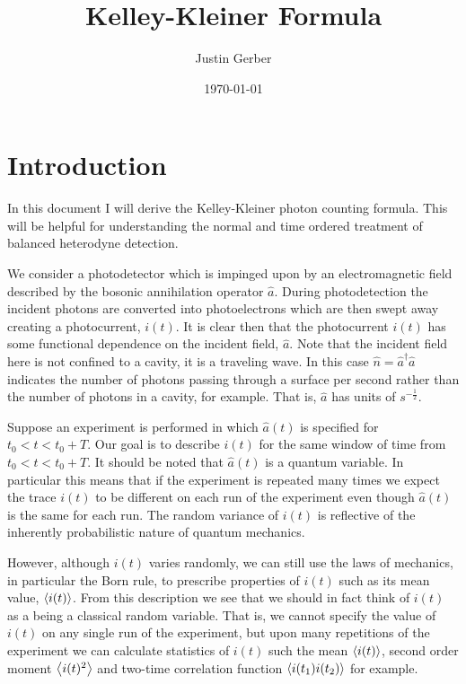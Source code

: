 \documentclass[12pt]{article}
\begin{document}
\title{Kelley-Kleiner Formula}
\author{Justin Gerber}
\date{\today}
\maketitle

\section{Introduction}
In this document I will derive the Kelley-Kleiner photon counting formula. This will be helpful for understanding the normal and time ordered treatment of balanced heterodyne detection.

We consider a photodetector which is impinged upon by an electromagnetic field described by the bosonic annihilation operator $\hat{a}$. During photodetection the incident photons are converted into photoelectrons which are then swept away creating a photocurrent, $i(t)$. It is clear then that the photocurrent $i(t)$ has some functional dependence on the incident field, $\hat{a}$. Note that the incident field here is not confined to a cavity, it is a traveling wave. In this case $\hat{n} = \hat{a}^{\dag} \hat{a}$ indicates the number of photons passing through a surface per second rather than the number of photons in a cavity, for example. That is, $\hat{a}$ has units of $s^{-\frac{1}{2}}$.

Suppose an experiment is performed in which $\hat{a}(t)$ is specified for $t_0<t<t_0+T$. Our goal is to describe $i(t)$ for the same window of time from $t_0<t<t_0+T$. It should be noted that $\hat{a}(t)$ is a quantum variable. In particular this means that if the experiment is repeated many times we expect the trace $i(t)$ to be different on each run of the experiment even though $\hat{a}(t)$ is the same for each run. The random variance of $i(t)$ is reflective of the inherently probabilistic nature of quantum mechanics.

However, although $i(t)$ varies randomly, we can still use the laws of mechanics, in particular the Born rule, to prescribe properties of $i(t)$ such as its mean value, $\Braket{i(t)}$. From this description we see that we should in fact think of $i(t)$ as a being a classical random variable. That is, we cannot specify the value of $i(t)$ on any single run of the experiment, but upon many repetitions of the experiment we can calculate statistics of $i(t)$ such the mean $\Braket{i(t)}$, second order moment $\Braket{i(t)^2}$ and two-time correlation function $\Braket{i(t_1)i(t_2)}$ for example.
\end{document}
